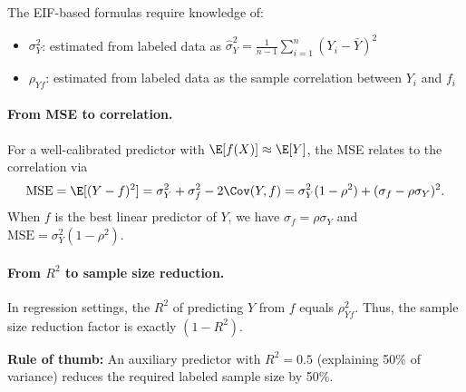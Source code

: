 The EIF-based formulas require knowledge of:
\begin{itemize}
    \item $\sigma_Y^2$: estimated from labeled data as $\widehat{\sigma}_Y^2 = \frac{1}{n-1}\sum_{i=1}^n(Y_i - \bar{Y})^2$
    \item $\rho_{Yf}$: estimated from labeled data as the sample correlation between $Y_i$ and $f_i$
\end{itemize}

\paragraph{From MSE to correlation.}
For a well-calibrated predictor with $\E[f(X)] \approx \E[Y]$, the MSE relates to the correlation via
\[
\text{MSE} = \E[(Y - f)^2] = \sigma_Y^2 + \sigma_f^2 - 2\Cov(Y, f) = \sigma_Y^2(1 - \rho^2) + (\sigma_f - \rho\sigma_Y)^2.
\]
When $f$ is the best linear predictor of $Y$, we have $\sigma_f = \rho\sigma_Y$ and $\text{MSE} = \sigma_Y^2(1 - \rho^2)$.

\paragraph{From $R^2$ to sample size reduction.}
In regression settings, the $R^2$ of predicting $Y$ from $f$ equals $\rho_{Yf}^2$.
Thus, the sample size reduction factor is exactly $(1 - R^2)$.

\begin{tcolorbox}
\textbf{Rule of thumb:} An auxiliary predictor with $R^2 = 0.5$ (explaining 50\% of variance)
reduces the required labeled sample size by 50\%.
\end{tcolorbox}
